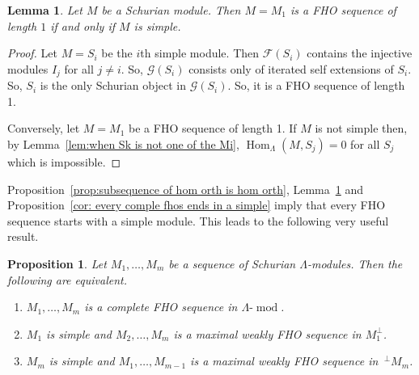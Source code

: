 \documentclass[10pt]{amsart}
\newtheorem{prop}[theo]{Proposition}
\newtheorem{lemm}[theo]{Lemma}
\theoremstyle{definition}
\DeclareMathOperator{\Hom}{Hom}%
\DeclareMathOperator{\modr}{mod}
\newcommand{\cF}{\ensuremath{{\mathcal{F}}}}
\newcommand{\cG}{\ensuremath{{\mathcal{G}}}}
\begin{document}
\begin{lemm}\label{lem:FHO of length one is simple}
Let $M$ be a Schurian module. Then $M=M_1$ is a FHO sequence of length $1$ if and only if $M$ is simple.
\end{lemm}

\begin{proof}
Let $M=S_i$ be the $i$th simple module. Then $\cF(S_i)$ contains the injective modules $I_j$ for all $j\neq i$. So, $\cG(S_i)$ consists only of iterated self extensions of $S_i$. So, $S_i$ is the only Schurian object in $\cG(S_i)$. So, it is a FHO sequence of length 1.

Conversely, let $M=M_1$ be a FHO sequence of length 1. If $M$ is not simple then, by Lemma~\ref{lem:when Sk is not one of the Mi}, $\Hom_\Lambda(M,S_j)=0$ for all $S_j$ which is impossible.%
\end{proof}

Proposition~\ref{prop:subsequence of hom orth is hom orth}, Lemma~\ref{lem:FHO of length one is simple} and Proposition~\ref{cor: every comple fhos ends in a simple} imply that every FHO sequence starts with a simple module. This leads to the following very useful result.

\begin{prop}\label{prop: complete iff M1 is simple and M2, etc is maximal}
Let $M_1,\ldots,M_m$ be a sequence of Schurian $\Lambda$-modules. Then the following are equivalent.
\begin{enumerate}[(1)]
\item\label{prop2.9_1} $M_1,\ldots,M_m$ is a complete FHO sequence in $\Lambda\text{-}\modr $.

\item\label{prop2.9_2} $M_1$ is simple and $M_2,\ldots,M_m$ is a maximal weakly FHO sequence in $M_1^\perp$.

\item\label{prop2.9_3} $M_m$ is simple and $M_1,\ldots,M_{m-1}$ is a maximal weakly FHO sequence in $\,^\perp M_m$.
\end{enumerate}
\end{prop}
\end{document}
